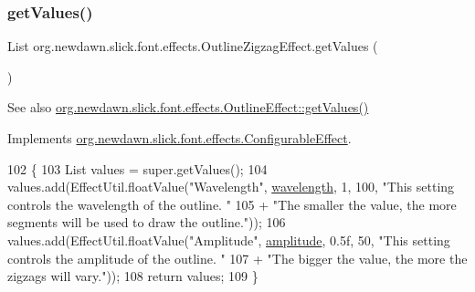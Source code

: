 \subsubsection{\texorpdfstring{get\+Values()}{getValues()}}
{\footnotesize\ttfamily List org.\+newdawn.\+slick.\+font.\+effects.\+Outline\+Zigzag\+Effect.\+get\+Values (\begin{DoxyParamCaption}{ }\end{DoxyParamCaption})\hspace{0.3cm}{\ttfamily [inline]}}

\begin{DoxySeeAlso}{See also}
\mbox{\hyperlink{classorg_1_1newdawn_1_1slick_1_1font_1_1effects_1_1_outline_effect_adbf0ba0c8ddcdc2a53c6a4e8c583fa33}{org.\+newdawn.\+slick.\+font.\+effects.\+Outline\+Effect\+::get\+Values()}} 
\end{DoxySeeAlso}


Implements \mbox{\hyperlink{interfaceorg_1_1newdawn_1_1slick_1_1font_1_1effects_1_1_configurable_effect_ac4ea8fedf0f9d7ca7ffe1bd5543d78cb}{org.\+newdawn.\+slick.\+font.\+effects.\+Configurable\+Effect}}.


\begin{DoxyCode}
102                             \{
103         List values = super.getValues();
104         values.add(EffectUtil.floatValue(\textcolor{stringliteral}{"Wavelength"}, \mbox{\hyperlink{classorg_1_1newdawn_1_1slick_1_1font_1_1effects_1_1_outline_zigzag_effect_a4393ec4437b469ea2855c70deec82d09}{wavelength}}, 1, 100, \textcolor{stringliteral}{"This setting controls
       the wavelength of the outline. "}
105             + \textcolor{stringliteral}{"The smaller the value, the more segments will be used to draw the outline."}));
106         values.add(EffectUtil.floatValue(\textcolor{stringliteral}{"Amplitude"}, \mbox{\hyperlink{classorg_1_1newdawn_1_1slick_1_1font_1_1effects_1_1_outline_zigzag_effect_a26543e6243bf5e4fb7486d7a7674ed1c}{amplitude}}, 0.5f, 50, \textcolor{stringliteral}{"This setting controls
       the amplitude of the outline. "}
107             + \textcolor{stringliteral}{"The bigger the value, the more the zigzags will vary."}));
108         \textcolor{keywordflow}{return} values;
109     \}
\end{DoxyCode}
\mbox{\label{classorg_1_1newdawn_1_1slick_1_1font_1_1effects_1_1_outline_zigzag_effect_a3d72b5f43bf6f8df727296ccc1d92208}} 
